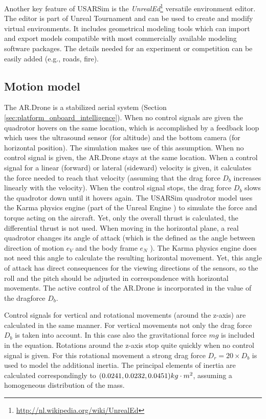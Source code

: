 Another key feature of USARSim is the \textit{UnrealEd}\footnote{\url{http://nl.wikipedia.org/wiki/UnrealEd}} versatile environment editor.
The editor is part of Unreal Tournament and can be used to create and modify virtual environments.
It includes geometrical modeling tools which can import and export models compatible with most commercially available modeling software packages.
The details needed for an experiment or competition can be easily added (e.g., roads, fire).



		\subsection{Motion model}
The AR.Drone is a stabilized aerial system (Section \ref{sec:platform_onboard_intelligence}). When no control signals are given the quadrotor hovers on the same location, which is accomplished by a feedback loop which uses the ultrasound sensor (for altitude) and the bottom camera (for horizontal position). The simulation makes use of this assumption. When no control signal is given, the AR.Drone stays at the same location.
When a control signal for a linear (forward) or lateral (sideward) velocity is given, it calculates the force needed to reach that velocity (assuming that the drag force $D_b$ increases linearly with the velocity). When the control signal stops, the drag force $D_b$ slows the quadrotor down until it hovers again.
The USARSim quadrotor model uses the Karma physics engine (part of the Unreal Engine \cite{Carpin2006}) to simulate the force and torque acting on the aircraft. Yet, only the overall thrust is calculated, the differential thrust is not used.
When moving in the horizontal plane, a real quadrotor changes its angle of attack (which is the defined as the angle between direction of motion $e_V$ and the body frame $e_N$ \cite{Yechout2003}). 
The Karma physics engine does not need this angle to calculate the resulting horizontal movement. Yet, this angle of attack has direct consequences for the viewing directions of the sensors, so the roll and the pitch should be adjusted in correspondence with horizontal movements. The active control of the AR.Drone is incorporated in the value of the dragforce $D_b$.

Control signals for vertical and rotational movements (around the z-axis) are calculated in the same manner. For vertical movements not only the drag force $D_b$ is taken into account. In this case also the gravitational force $mg$ is included in the equation. Rotations around the z-axis stop quite quickly when no control signal is given. For this rotational movement a strong drag force $D_r = 20 \times D_b$ is used to model the additional inertia. 
The principal elements of inertia are calculated correspondingly to $(0.0241, 0.0232, 0.0451)\small{kg\cdot m^2}$, assuming a homogeneous distribution of the mass.

